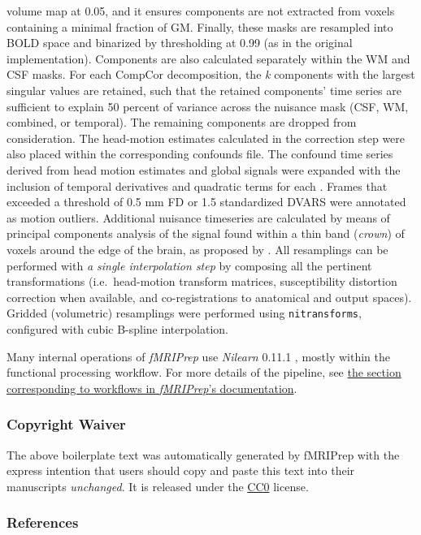 \documentclass[
]{article}
\begin{document}
\begin{description}
volume map at 0.05, and it ensures components are not extracted from
voxels containing a minimal fraction of GM. Finally, these masks are
resampled into BOLD space and binarized by thresholding at 0.99 (as in
the original implementation). Components are also calculated separately
within the WM and CSF masks. For each CompCor decomposition, the
\emph{k} components with the largest singular values are retained, such
that the retained components' time series are sufficient to explain 50
percent of variance across the nuisance mask (CSF, WM, combined, or
temporal). The remaining components are dropped from consideration. The
head-motion estimates calculated in the correction step were also placed
within the corresponding confounds file. The confound time series
derived from head motion estimates and global signals were expanded with
the inclusion of temporal derivatives and quadratic terms for each
\citep{confounds_satterthwaite_2013}. Frames that exceeded a threshold
of 0.5 mm FD or 1.5 standardized DVARS were annotated as motion
outliers. Additional nuisance timeseries are calculated by means of
principal components analysis of the signal found within a thin band
(\emph{crown}) of voxels around the edge of the brain, as proposed by
\citep{patriat_improved_2017}. All resamplings can be performed with
\emph{a single interpolation step} by composing all the pertinent
transformations (i.e.~head-motion transform matrices, susceptibility
distortion correction when available, and co-registrations to anatomical
and output spaces). Gridded (volumetric) resamplings were performed
using \texttt{nitransforms}, configured with cubic B-spline
interpolation.
\end{description}

Many internal operations of \emph{fMRIPrep} use \emph{Nilearn} 0.11.1
\citep[RRID:SCR\_001362]{nilearn}, mostly within the functional
processing workflow. For more details of the pipeline, see
\href{https://fmriprep.readthedocs.io/en/latest/workflows.html}{the
section corresponding to workflows in \emph{fMRIPrep}'s documentation}.

\subsubsection{Copyright Waiver}\label{copyright-waiver}

The above boilerplate text was automatically generated by fMRIPrep with
the express intention that users should copy and paste this text into
their manuscripts \emph{unchanged}. It is released under the
\href{https://creativecommons.org/publicdomain/zero/1.0/}{CC0} license.

\subsubsection{References}\label{references}


\end{document}
